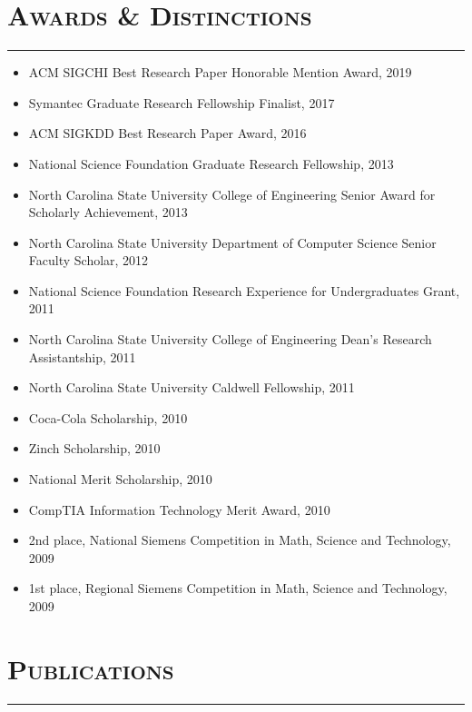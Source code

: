 \documentclass{article}
\newcommand{\HRule}{\rule{\linewidth}{0.5mm}}
\begin{document}
\section*{\bf \textsc{Awards \& Distinctions}}
\vspace{-5mm}\HRule
\begin{itemize}
\item ACM SIGCHI Best Research Paper Honorable Mention Award, 2019
\item Symantec Graduate Research Fellowship Finalist, 2017
\item ACM SIGKDD Best Research Paper Award, 2016
\item National Science Foundation Graduate Research Fellowship, 2013
\item North Carolina State University College of Engineering Senior Award for Scholarly Achievement, 2013
\item North Carolina State University Department of Computer Science Senior Faculty Scholar, 2012
 \item National Science Foundation Research Experience for Undergraduates Grant, 2011
 \item North Carolina State University College of Engineering Dean's Research Assistantship, 2011
\item North Carolina State University Caldwell Fellowship, 2011
\item Coca-Cola Scholarship, 2010
\item Zinch Scholarship, 2010
\item National Merit Scholarship, 2010
\item CompTIA Information Technology Merit Award, 2010
\item 2nd place, National Siemens Competition in Math, Science and Technology, 2009
\item 1st place, Regional Siemens Competition in Math, Science and Technology, 2009
\end{itemize}

\section*{\bf \textsc{Publications}}
\vspace{-5mm}\HRule
\end{document}
